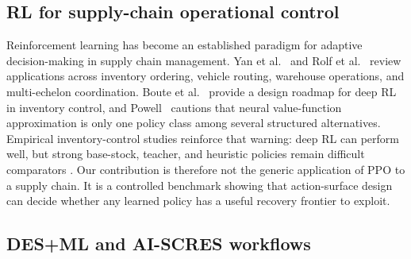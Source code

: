 \hypertarget{23-rl-for-supply-chain-operational-control}{%
\subsection{RL for supply-chain operational control}\label{23-rl-for-supply-chain-operational-control}}

Reinforcement learning has become an established paradigm for adaptive
decision-making in supply chain management. Yan et al.~\cite{yan2022}
and Rolf et al.~\cite{rolf2023} review applications across inventory
ordering, vehicle routing, warehouse operations, and multi-echelon
coordination. Boute et al.~\cite{boute2022} provide a design roadmap for
deep RL in inventory control, and Powell~\cite{powell2022} cautions that
neural value-function approximation is only one policy class among
several structured alternatives. Empirical inventory-control studies
reinforce that warning: deep RL can perform well, but strong base-stock,
teacher, and heuristic policies remain difficult comparators
\cite{gijsbrechts2022,demoor2022,dehaybe2024,geevers2024,temizoz2025,vanvuchelen2025}.
Our contribution is therefore not the generic application of PPO to a
supply chain. It is a controlled benchmark showing that action-surface
design can decide whether any learned policy has a useful recovery
frontier to exploit.

\hypertarget{24-des-ml-and-ai-scres}{%
\subsection{DES+ML and AI-SCRES workflows}\label{24-des-ml-and-ai-scres}}

